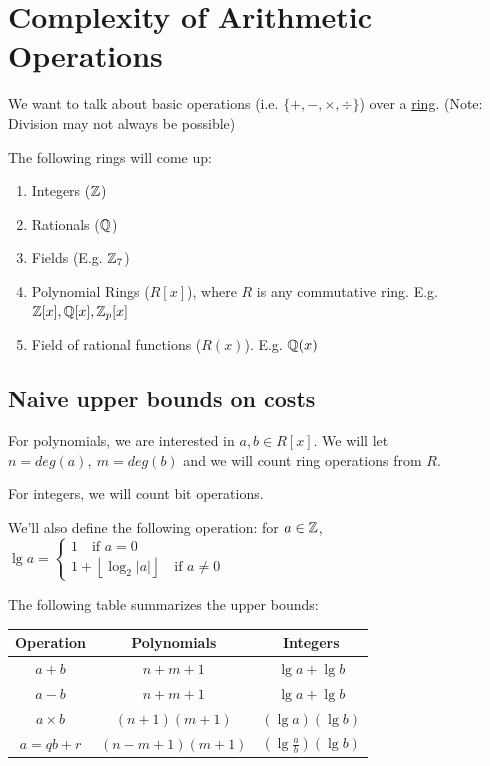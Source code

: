 \section{Complexity of Arithmetic Operations}

We want to talk about basic operations (i.e. $\{+, -, \times, \div \}$) over a \underline{ring}. (Note: Division may not always be possible)

\begin{example}
    The following rings will come up:
    \begin{enumerate}
        \item Integers ($\mathbb{Z}$)
        \item Rationals ($\mathbb{Q}$)
        \item Fields (E.g. $\mathbb{Z}_7$)
        \item Polynomial Rings ($R[x]$), where $R$ is any commutative ring. E.g. $\mathbb{Z}[x], \mathbb{Q}[x], \mathbb{Z}_p[x]$
        \item Field of rational functions ($R(x)$). E.g. $\mathbb{Q}(x)$
    \end{enumerate}
\end{example}

\subsection{Naive upper bounds on costs}
For polynomials, we are interested in $a,b \in R[x]$. We will let $n = deg(a),\ m = deg(b)$ and we will count ring operations from $R$.

For integers, we will count bit operations.

We'll also define the following operation: for $a \in \mathbb{Z}$, $\lg a = \begin{cases}1 \quad \text{if } a = 0 \\ 1 + \left \lfloor \log_2 |a| \right\rfloor \quad \text{if } a \neq 0 \end{cases}$

The following table summarizes the upper bounds:
\begin{center}
\begin{tabular}{c|c|c}
    Operation & Polynomials & Integers \\
    \hline
    $a + b$ & $n + m + 1$ & $\lg a + \lg b$\\
    $a - b$ & $n + m + 1$ & $\lg a + \lg b$\\
    $a \times b$ & $(n+1)(m+1)$ & $(\lg a)(\lg b)$\\
    $a = qb + r$ & $(n-m+1)(m+1)$ & $(\lg \frac{a}{b})(\lg b)$
\end{tabular}
\end{center}

